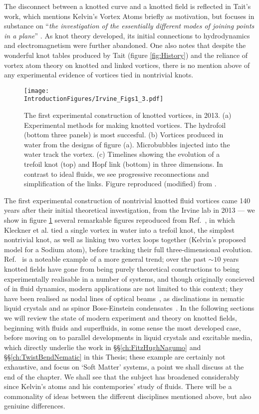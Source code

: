 The disconnect between a knotted curve and a knotted field is reflected in Tait's work, which mentions Kelvin's Vortex Atoms briefly as motivation, but focuses in substance on ``\emph{the investigation of the essentially different modes of joining points in a plane}'' \citep{Tait1}. As knot theory developed, its initial connections to hydrodynamics and electromagnetism were further abandoned. One also notes that despite the wonderful knot tables produced by Tait (figure \ref{fig:History}) and the reliance of vortex atom theory on knotted and linked vortices, there is no mention above of any experimental evidence of vortices tied in nontrivial knots. 
\begin{figure}[htbp]
\centering
\texttt{[image: \\IntroductionFigures/Irvine\_Figs1\_3.pdf]}
\caption{The first experimental construction of knotted vortices, in 2013. (a) Experimental methods for making knotted vortices. The hydrofoil (bottom three panels) is most succesful. (b) Vortices produced in water from the designs of figure (a). Microbubbles injected into the water track the vortex. (c) Timelines showing the evolution of a trefoil knot (top) and Hopf link (bottom) in three dimensions. In contrast to ideal fluids, we see progressive reconnections and simplification of the links. Figure reproduced (modified) from \citep{Kleckner2013}.}
\label{fig:Irvine}
\end{figure}

The first experimental construction of nontrivial knotted fluid vortices came 140 years after their initial theoretical investigation, from the Irvine lab in 2013 --- we show in figure \ref{fig:Irvine} several remarkable figures reproduced from Ref.~\citep{Kleckner2013}, in which Kleckner et al. tied a single vortex in water into a trefoil knot, the simplest nontrivial knot, as well as linking two vortex loops together (Kelvin's proposed model for a Sodium atom), before tracking their full three-dimensional evolution. Ref.~\citep{Kleckner2013} is a noteable example of a more general trend; over the past $\sim10$ years knotted fields have gone from being purely theoretical constructions to being experimentally realisable in a number of systems, and though originally concieved of in fluid dynamics, modern applications are not limited to this context; they have been realised as nodal lines of optical beams~\citep{Dennis2010}, as disclinations in nematic liquid crystals and as spinor Bose-Einstein condensates~\citep{Tkalec2011,Tasinkevych2014,Copar2015}. In the following sections we will review the state of modern experiment and theory on knotted fields, beginning with fluids and superfluids, in some sense the most developed case, before moving on to parallel developments in liquid crystals and excitable media, which directly underlie the work in \S\S \ref{ch:FitzHughNagumo} and \S\S \ref{ch:TwistBendNematic} in this Thesis; these example are certainly not exhaustive, and focus on `Soft Matter' systems, a point we shall discuss at the end of the chapter. We shall see that the subject has broadened considerably since Kelvin's atoms and his contempories' study of fluids. There will be a commonality of ideas between the different disciplines mentioned above, but also geniuine differences.

